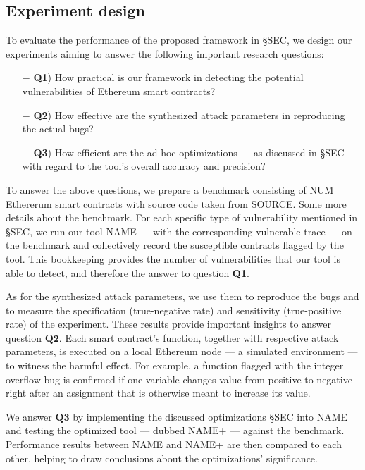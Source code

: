 \documentclass[runningheads]{llncs}
\newcommand{\ct}[1]{{\color{red}#1}}
\begin{document}
\subsection{Experiment design}\label{sub:exp-design}

To evaluate the performance of the proposed framework in \S\ct{SEC}, we design our experiments aiming to answer the following important research questions:

\begin{enumerate}
	\item[$-$] \textbf{Q1}) How practical is our framework in detecting the potential vulnerabilities of Ethereum smart contracts?
	\item[$-$] \textbf{Q2}) How effective are the synthesized attack parameters in reproducing the actual bugs? 
	\item[$-$] \textbf{Q3}) How efficient are the ad-hoc optimizations --- as discussed in \S\ct{SEC} -- with regard to the tool's overall accuracy and precision? 
\end{enumerate}

To answer the above questions, we prepare a benchmark consisting of \ct{NUM} Ethererum smart contracts with source code taken from \ct{SOURCE}. \ct{Some more details about the benchmark}. For each specific type of vulnerability mentioned in \S\ct{SEC}, we run our tool \ct{NAME} --- with the corresponding vulnerable trace --- on the benchmark  and collectively record the susceptible contracts flagged by the tool. This bookkeeping provides the number of vulnerabilities that our tool is able to detect, and therefore the answer to question \textbf{Q1}. 

As for the synthesized attack parameters, we use them to reproduce the bugs and to measure the specification (true-negative rate) and sensitivity (true-positive rate) of the experiment. These results provide important insights to answer question $\textbf{Q2}$. Each smart contract's function, together with respective attack parameters, is executed on a local Ethereum node --- a simulated environment --- to witness the harmful effect. For example, a function flagged with the integer overflow bug is confirmed if one variable changes value from positive to negative right after an assignment that is otherwise meant to increase its value.

We answer $\textbf{Q3}$ by implementing the discussed optimizations \S\ct{SEC} into \ct{NAME} and testing the optimized tool --- dubbed \ct{NAME+} --- against the benchmark. Performance results between \ct{NAME} and \ct{NAME+} are then compared to each other, helping to draw conclusions about the optimizations' significance.
\end{document}
